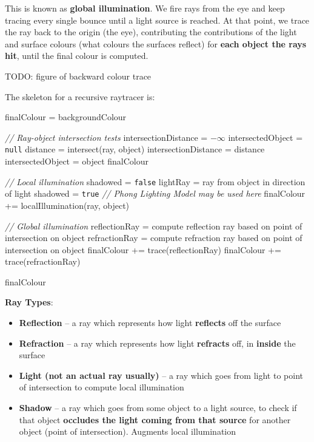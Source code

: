 \documentclass{article}
\begin{document}
This is known as \textbf{global illumination}. We fire rays from the eye and keep tracing every single bounce until a light source is reached. At that point, we trace the ray back to the origin (the eye), contributing the contributions of the light and surface colours (what colours the surfaces reflect) for \textbf{each object the rays hit}, until the final colour is computed.

TODO: figure of backward colour trace

The skeleton for a recursive raytracer is:
\begin{algorithmic}[1]
	\STATE finalColour = backgroundColour
	
	\STATE \textit{// Ray-object intersection tests}
	\STATE intersectionDistance = $-\infty$
	\STATE intersectedObject = \texttt{null}
		\STATE distance = intersect(ray, object)
			\STATE intersectionDistance = distance
			\STATE intersectedObject = object
		\ENDIF
	\ENDFOR 
		\RETURN finalColour
	\ENDIF
	\STATE 
	
	\STATE \textit{// Local illumination}	
		\STATE shadowed = \texttt{false}
			\STATE lightRay = ray from object in direction of light
				\STATE shadowed = \texttt{true}
			\ENDIF
		\ENDFOR
			\STATE \textit{// Phong Lighting Model may be used here}
			\STATE finalColour += localIllumination(ray, object)
		\ENDIF
	\ENDFOR
	\STATE 	
	
	\STATE \textit{// Global illumination}
	\STATE reflectionRay = compute reflection ray based on point of intersection on object
	\STATE refractionRay = compute refraction ray based on point of intersection on object
	\STATE finalColour += trace(reflectionRay)
	\STATE finalColour += trace(refractionRay)
	\STATE 	
	
	\RETURN finalColour
\end{algorithmic}

\textbf{Ray Types}:
\begin{itemize}
	\item \textbf{Reflection} -- a ray which represents how light \textbf{reflects} off the surface
	\item \textbf{Refraction} -- a ray which represents how light \textbf{refracts} off, in \textbf{inside} the surface
	\item \textbf{Light (not an actual ray usually)} -- a ray which goes from light to point of intersection to compute local illumination
	\item \textbf{Shadow} -- a ray which goes from some object to a light source, to check if that object \textbf{occludes the light coming from that source} for another object (point of intersection). Augments local illumination
\end{itemize}
\end{document}
